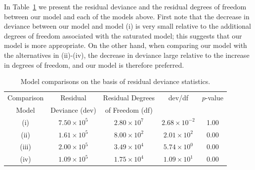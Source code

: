 \documentclass[12pt]{article}
\begin{document}
In Table~\ref{table:goodnessoffit} we present the residual deviance and the residual degrees of freedom between our model and each of the models above. First note that the decrease in deviance between our model and model (i) is very small relative to the additional degrees of freedom associated with the saturated model; this suggests that our model is more appropriate. On the other hand, when comparing our model with the alternatives in (ii)-(iv), the decrease in deviance large relative to the increase in degrees of freedom, and our model is therefore preferred.    




\begin{table}[ht]
\begin{center}
\caption{Model comparisons on the basis of residual deviance statistics. \label{table:goodnessoffit}}
\begin{tabular}{ | c | c | c | c  | c |}
\hline
Comparison  & Residual  & Residual Degrees & dev/df & $p$-value \\
Model            & Deviance (dev)             & of Freedom (df)  &        &           \\
\hline
(i) &  $7.50 \times 10^5$  & $2.80\times 10^7$  &  $2.68 \times 10^{-2}$   &  1.00 \\
\hline
(ii)  &  $1.61 \times 10^5$  &  $8.00 \times 10^2$  &  $2.01 \times 10^2$ &  0.00\\
(iii)  &  $2.00 \times 10^5$ & $3.49 \times 10^4$  & $5.74 \times 10^0$&  0.00 \\
(iv) & $1.09 \times 10^5$ & $1.75 \times 10^4$ & $1.09 \times 10^1$ & 0.00 \\
\hline
\end{tabular}
\vspace*{-10mm}
\end{center}
\end{table}
\end{document}
